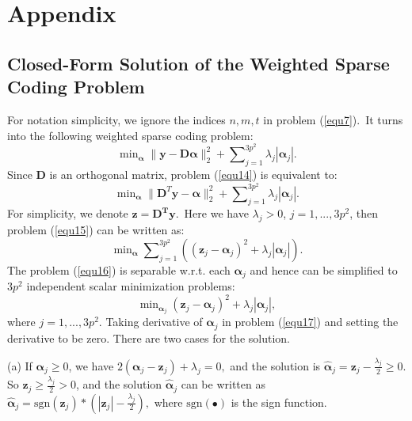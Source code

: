 %
\chapter{Appendix}
\label{sec:appendix}

\section{Closed-Form Solution of the Weighted Sparse Coding Problem}

For notation simplicity, we ignore the indices $n,m,t$ in problem (\ref{equ7}).\ It turns into the following weighted sparse coding problem:
\begin{equation}
\label{equ8-1}
\min\nolimits_{\bm{\alpha}}\|\bm{y}-\bm{D}\bm{\alpha}\|_{2}^{2}+\sum\nolimits_{j=1}^{3p^2}\lambda_{j}|\bm{\alpha}_{j}|.
\end{equation}
Since $\bm{D}$ is an orthogonal matrix, problem (\ref{equ14}) is equivalent to:
\begin{equation}
\label{equ8-2}
\min\nolimits_{\bm{\alpha}}\|\bm{D}^{T}\bm{y}-\bm{\alpha}\|_{2}^{2}+\sum\nolimits_{j=1}^{3p^2}\lambda_{j}|\bm{\alpha}_{j}|.
\end{equation}
For simplicity, we denote $\bm{z} = \bm{D^{T}y}$.\ Here we have $\lambda_{j}>0$, $j=1,...,3p^2$, then problem (\ref{equ15}) can be written as:
\begin{equation}
\label{equ8-3}
\min\nolimits_{\boldsymbol{\alpha}}\sum\nolimits_{j=1}^{3p^2}((\bm{z}_{j}-\bm{\alpha}_{j})^{2}+\lambda_{j}|\bm{\alpha}_{j}|).
\end{equation}
The problem (\ref{equ16}) is separable w.r.t. each $\bm{\alpha}_{j}$ and hence can be simplified to $3p^2$ independent scalar minimization problems:
\begin{equation}
\label{equ8-4}
\min\nolimits_{\bm{\alpha}_{j}}(\bm{z}_{j}-\bm{\alpha}_{j})^{2}+\lambda_{j}|\bm{\alpha}_{j}|,
\end{equation}
where $j=1,...,3p^2$. Taking derivative of $\bm{\alpha}_{j}$ in problem (\ref{equ17}) and setting the derivative to be zero. There are two cases for the solution.

(a) If $\bm{\alpha}_{j}\ge 0$, we have 
$
2(\bm{\alpha}_{j}-\bm{z}_{j})+\lambda_{j}=0,
$ and the solution is
$
\hat{\bm{\alpha}}_{j}=\bm{z}_{j}-\frac{\lambda_{j}}{2} \ge 0.
$
So $\bm{z}_{j}\ge\frac{\lambda_{j}}{2}> 0$, and the solution $\hat{\bm{\alpha}}_{j}$ can be written as
$
\hat{\bm{\alpha}}_{j}=\text{sgn}(\bm{z}_{j})*(|\bm{z}_{j}|-\frac{\lambda_{j}}{2}),
$
where $\text{sgn}(\bullet)$ is the sign function. 

